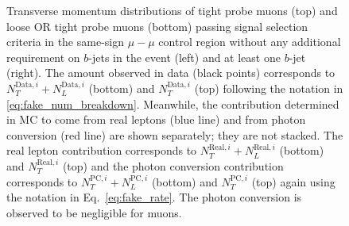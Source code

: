 \begin{figure}[tb]
{}
\caption{Transverse momentum distributions of tight probe 
muons (top) and loose OR tight probe muons (bottom) passing signal 
selection criteria in the same-sign $\mu-\mu$ control region 
without any additional requirement on $b$-jets in the event (left) and 
at least one $b$-jet (right). 
The amount observed in data (black points) corresponds 
to $N_T^{\textrm{Data},i}+N_L^{\textrm{Data},i}$ (bottom) and $N_T^{\textrm{Data},i}$ (top) following the notation
in \eqn\ref{eq:fake_num_breakdown}.
Meanwhile, the contribution determined in MC to come from 
real leptons (blue line) and from photon conversion (red line) are shown 
separately; they are not stacked. The real lepton contribution corresponds to 
$N_T^{\textrm{Real},i}+N_L^{\textrm{Real},i}$ (bottom) and $N_T^{\textrm{Real},i}$ 
(top) and the photon conversion 
contribution 
corresponds to $N_T^{\textrm{PC},i}+N_L^{\textrm{PC},i}$ (bottom) 
and $N_T^{\textrm{PC},i}$ (top) again using the notation 
in Eq.~\ref{eq:fake_rate}. 
The photon conversion is 
observed to be negligible for muons.  }
\label{fig:fakeEff_CRs_muon}
\end{figure}


